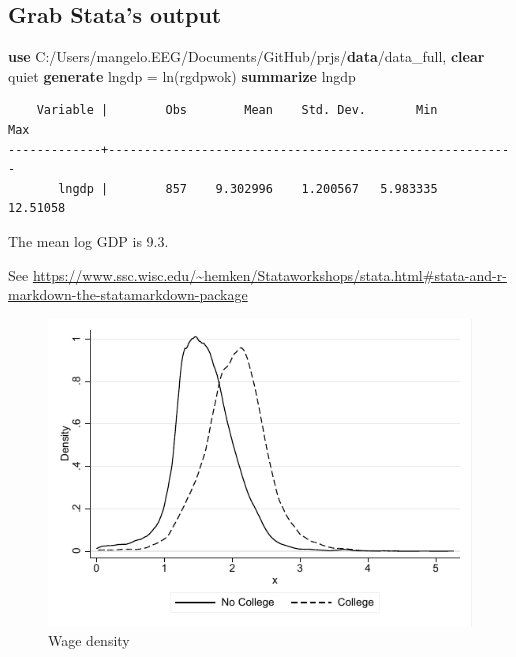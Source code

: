 \documentclass[
  12pt,
]{article}
\newenvironment{Shaded}{\begin{snugshade}}{\end{snugshade}}
\newcommand{\FunctionTok}[1]{\textcolor[rgb]{0.00,0.00,0.00}{#1}}
\newcommand{\KeywordTok}[1]{\textcolor[rgb]{0.13,0.29,0.53}{\textbf{#1}}}
\newcommand{\NormalTok}[1]{#1}
\begin{document}
\hypertarget{grab-statas-output}{%
\subsection{Grab Stata's output}\label{grab-statas-output}}

\begin{Shaded}
\begin{Highlighting}[]
\KeywordTok{use}\NormalTok{ C:/Users/mangelo.EEG/Documents/GitHub/prjs/}\KeywordTok{data}\NormalTok{/data\_full, }\KeywordTok{clear}
\NormalTok{        quiet }\KeywordTok{generate}\NormalTok{ lngdp = }\FunctionTok{ln}\NormalTok{(rgdpwok)}
      \KeywordTok{summarize}\NormalTok{ lngdp}
\end{Highlighting}
\end{Shaded}

\begin{verbatim}
    Variable |        Obs        Mean    Std. Dev.       Min        Max
-------------+---------------------------------------------------------
       lngdp |        857    9.302996    1.200567   5.983335   12.51058
\end{verbatim}

\vspace{0.3cm}

The mean log GDP is 9.3.

\vspace{0.3cm}

See \url{https://www.ssc.wisc.edu/~hemken/Stataworkshops/stata.html\#stata-and-r-markdown-the-statamarkdown-package}

\begin{figure}
\centering
\includegraphics{logs/density.pdf}
\caption{Wage density}
\end{figure}
\end{document}
